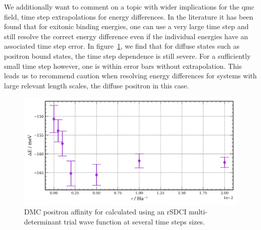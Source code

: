 We additionally want to comment on a topic with wider implications for the \gls{qmc} field, time step extrapolations for energy differences.
In the literature it has been found that for exitonic binding energies, one can use a very large time step and still resolve the correct energy difference even if the individual energies have an associated time step error.\cite{10.1103/PhysRevB.98.075122}
In figure~\ref{fig:be_e_diff_ts}, we find that for diffuse states such as positron bound states, the time step dependence is still severe.
For a sufficiently small time step however, one is within error bars without extrapolation.
This leads us to recommend caution when resolving energy differences for systems with large relevant length scales, the diffuse positron in this case.

\begin{figure}
    \includegraphics[width=\columnwidth,keepaspectratio]{Images/chapter5/be_rSDCI_multidet.png}
    \caption{\label{fig:be_e_diff_ts} DMC positron affinity for  calculated using an rSDCI multi-determinant trial wave function at several time steps sizes. }
\end{figure}




